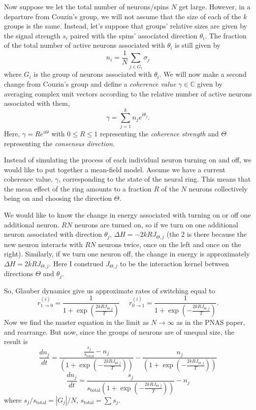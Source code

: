 \documentclass[12pt]{article}
\begin{document}
Now suppose we let the total number of neurons/spins $N$ get large. However, in a departure from Couzin's group, we will not assume that the size of each of the $k$ groups is the same. Instead, let's suppose that groups' relative sizes are given by the signal strength $s_i$ paired with the spins' associated direction $\theta_i$. The fraction of the total number of active neurons associated with $\theta_i$ is still given by
\[
n_i = \frac{1}{N}\sum_{j\in G_i}\sigma_j
\]
where $G_i$ is the group of neurons associated with $\theta_i$. We will now make a second change from Couzin's group and define a \textit{coherence value} $\gamma\in\mathbb{C}$ given by averaging complex unit vectors according to the relative number of active neurons associated with them,
\begin{equation}
\gamma = \sum_{j=1}^{k}n_j e^{i\theta_j}.\label{eq:gamma}
\end{equation}
Here, $\gamma = Re^{i\Theta}$ with $0\leq R\leq 1$ representing the \textit{coherence strength} and $\Theta$ representing the \textit{consensus direction}.

Instead of simulating the process of each individual neuron turning on and off, we would like to put together a mean-field model. Assume we have a current coherence value, $\gamma$, corresponding to the state of the neural ring. This means that the mean effect of the ring amounts to a fraction $R$ of the $N$ neurons collectively being on and choosing the direction $\Theta$. 

We would like to know the change in energy associated with turning on or off one additional neuron. $RN$ neurons are turned on, so if we turn on one additional neuron associated with direction $\theta_j$, $\Delta H = -2kRJ_{\Theta,j}$ (the 2 is there because the new neuron interacts with $RN$ neurons twice, once on the left and once on the right). Similarly, if we turn one neuron off, the change in energy is approximately $\Delta H = 2kRJ_{\Theta,j}$. Here I construed $J_{\Theta,j}$ to be the interaction kernel between directions $\Theta$ and $\theta_j$.

So, Glauber dynamics give us approximate rates of switching equal to
\[
r^{(i)}_{1\rightarrow 0} = \frac{1}{1+\exp\left(\frac{2kRJ_{\Theta,j}}{T}\right)}\ \ \ \ \ \ r^{(i)}_{0\rightarrow 1} = \frac{1}{1+\exp\left(-\frac{2kRJ_{\Theta,j}}{T}\right)}.
\]
Now we find the master equation in the limit as $N\rightarrow\infty$ as in the PNAS paper, and rearrange. But now, since the groups of neurons are of unequal size, the result is
\[
\frac{dn_j}{dt} = \frac{\frac{s_j}{s_{\text{total}}}-n_j}{\left(1+\exp\left(-\frac{2kRJ_{\Theta,j}}{T}\right)\right)} - \frac{n_j}{\left(1+\exp\left(-\frac{2kRJ_{\Theta,j}}{T}\right)\right)}
\]
\[
\frac{dn_j}{dt} = \frac{s_j}{s_{\text{total}}\left(1+\exp\left(-\frac{2kRJ_{\Theta,j}}{T}\right)\right)} - n_j
\]
where $s_j/s_{\text{total}} = |G_j|/N$, $s_{\text{total}} = \sum s_j$.
\end{document}

